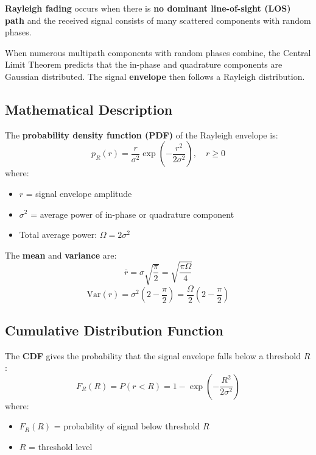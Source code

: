\textbf{Rayleigh fading} occurs when there is \textbf{no dominant line-of-sight (LOS) path} and the received signal consists of many scattered components with random phases.

\begin{keyconcept}
When numerous multipath components with random phases combine, the Central Limit Theorem predicts that the in-phase and quadrature components are Gaussian distributed. The signal \textbf{envelope} then follows a Rayleigh distribution.
\end{keyconcept}

\subsection{Mathematical Description}

The \textbf{probability density function (PDF)} of the Rayleigh envelope is:
\begin{equation}
p_R(r) = \frac{r}{\sigma^2} \exp\left(-\frac{r^2}{2\sigma^2}\right), \quad r \geq 0
\end{equation}
where:
\begin{itemize}
\item $r$ = signal envelope amplitude
\item $\sigma^2$ = average power of in-phase or quadrature component
\item Total average power: $\Omega = 2\sigma^2$
\end{itemize}

The \textbf{mean} and \textbf{variance} are:
\begin{equation}
\bar{r} = \sigma\sqrt{\frac{\pi}{2}} = \sqrt{\frac{\pi \Omega}{4}}
\end{equation}
\begin{equation}
\text{Var}(r) = \sigma^2\left(2 - \frac{\pi}{2}\right) = \frac{\Omega}{2}\left(2 - \frac{\pi}{2}\right)
\end{equation}

\subsection{Cumulative Distribution Function}

The \textbf{CDF} gives the probability that the signal envelope falls below a threshold $R$:
\begin{equation}
F_R(R) = P(r < R) = 1 - \exp\left(-\frac{R^2}{2\sigma^2}\right)
\end{equation}
where:
\begin{itemize}
\item $F_R(R)$ = probability of signal below threshold $R$
\item $R$ = threshold level
\end{itemize}

